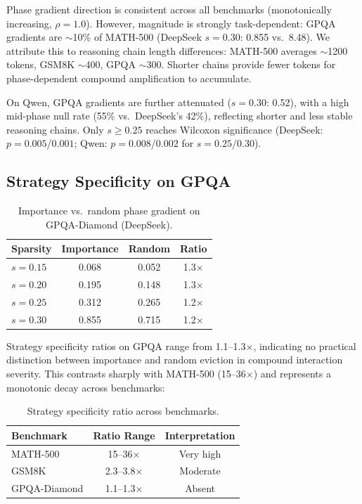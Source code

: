 \documentclass[11pt,a4paper]{article}
\begin{document}
Phase gradient direction is consistent across all benchmarks (monotonically increasing, $\rho = 1.0$). However, magnitude is strongly task-dependent: GPQA gradients are $\sim$10\% of MATH-500 (DeepSeek $s=0.30$: 0.855 vs.\ 8.48). We attribute this to reasoning chain length differences: MATH-500 averages $\sim$1200 tokens, GSM8K $\sim$400, GPQA $\sim$300. Shorter chains provide fewer tokens for phase-dependent compound amplification to accumulate.

On Qwen, GPQA gradients are further attenuated ($s=0.30$: 0.52), with a high mid-phase null rate (55\% vs.\ DeepSeek's 42\%), reflecting shorter and less stable reasoning chains. Only $s \geq 0.25$ reaches Wilcoxon significance (DeepSeek: $p = 0.005$/$0.001$; Qwen: $p = 0.008$/$0.002$ for $s=0.25$/$0.30$).

\subsection{Strategy Specificity on GPQA}

\begin{table}[h]
\centering
\small
\caption{Importance vs.\ random phase gradient on GPQA-Diamond (DeepSeek).}
\begin{tabular}{lccc}
\toprule
Sparsity & Importance & Random & Ratio \\
\midrule
$s=0.15$ & 0.068 & 0.052 & 1.3$\times$ \\
$s=0.20$ & 0.195 & 0.148 & 1.3$\times$ \\
$s=0.25$ & 0.312 & 0.265 & 1.2$\times$ \\
$s=0.30$ & 0.855 & 0.715 & 1.2$\times$ \\
\bottomrule
\end{tabular}
\label{tab:gpqa_specificity}
\end{table}

Strategy specificity ratios on GPQA range from 1.1--1.3$\times$, indicating no practical distinction between importance and random eviction in compound interaction severity. This contrasts sharply with MATH-500 (15--36$\times$) and represents a monotonic decay across benchmarks:

\begin{table}[h]
\centering
\small
\caption{Strategy specificity ratio across benchmarks.}
\begin{tabular}{lcc}
\toprule
Benchmark & Ratio Range & Interpretation \\
\midrule
MATH-500 & 15--36$\times$ & Very high \\
GSM8K & 2.3--3.8$\times$ & Moderate \\
GPQA-Diamond & 1.1--1.3$\times$ & Absent \\
\bottomrule
\end{tabular}
\label{tab:specificity_decay}
\end{table}
\end{document}
